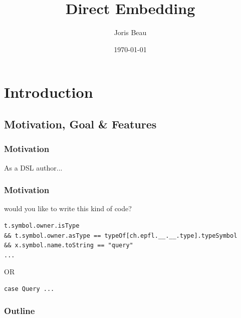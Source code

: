 \documentclass{beamer}
\title[Direct Embedding]{Direct Embedding} %
\author{Joris Beau} %
\institute[EPFL] %
{
EPFL - LAMP \\ %
Project in computer science\\


Directed by \textbf{Martin Odersky}, Supervised by \textbf{Vojin Jovanovic}\\
\subject{Computer Science}
\medskip
}
\date{\today} %
\begin{document}

\begin{frame}
\titlepage %
\end{frame}

\section{Introduction} %

\subsection{Motivation, Goal \& Features } %

\begin{frame}[fragile]
\frametitle{Motivation}

\centerline{As a DSL author...}

\end{frame}


\begin{frame}[fragile]
\frametitle{Motivation}

\centerline{would you like to write this kind of code?}
\begin{lstlisting}
t.symbol.owner.isType
&& t.symbol.owner.asType == typeOf[ch.epfl.__.__.type].typeSymbol
&& x.symbol.name.toString == "query"
...
\end{lstlisting}

\centerline{OR}
\begin{lstlisting}
case Query ...
\end{lstlisting}


\end{frame}


\begin{frame}
\frametitle{Outline} %
\tableofcontents
\end{frame}
\end{document}
